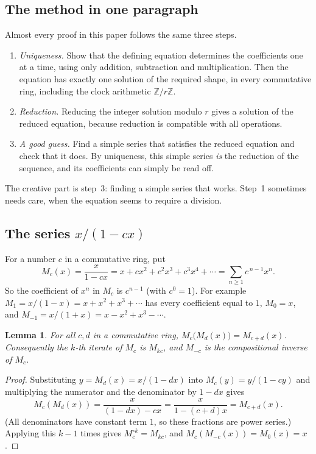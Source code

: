 \documentclass[11pt,a4paper]{article}
\newtheorem{lemma}[theorem]{Lemma}
\theoremstyle{definition}
\theoremstyle{remark}
\newcommand{\Z}{\mathbb{Z}}
\begin{document}
\subsection{The method in one paragraph}
Almost every proof in this paper follows the same three steps.
\begin{enumerate}
\item \emph{Uniqueness.} Show that the defining equation determines the coefficients one at a time, using only
addition, subtraction and multiplication. Then the equation has exactly one solution of the required shape, in every
commutative ring, including the clock arithmetic $\Z/r\Z$.
\item \emph{Reduction.} Reducing the integer solution modulo $r$ gives a solution of the reduced equation,
because reduction is compatible with all operations.
\item \emph{A good guess.} Find a simple series that satisfies the reduced equation and check that it does. By uniqueness,
this simple series \emph{is} the reduction of the sequence, and its coefficients can simply be read off.
\end{enumerate}
The creative part is step~3: finding a simple series that works. Step~1 sometimes needs care, when the equation seems to
require a division.
\subsection{The series \texorpdfstring{$x/(1-cx)$}{x/(1-cx)}}
For a number $c$ in a commutative ring, put
\[
M_c(x)=\frac{x}{1-cx}=x+cx^2+c^2x^3+c^3x^4+\cdots=\sum_{n\ge1}c^{\,n-1}x^n .
\]
So the coefficient of $x^n$ in $M_c$ is $c^{n-1}$ (with $c^0=1$). For example $M_1=x/(1-x)=x+x^2+x^3+\cdots$ has every
coefficient equal to $1$, $M_0=x$, and $M_{-1}=x/(1+x)=x-x^2+x^3-\cdots$.

\begin{lemma}\label{lem:mobius}
For all $c,d$ in a commutative ring, $M_c\bigl(M_d(x)\bigr)=M_{c+d}(x)$. Consequently the $k$-th iterate of $M_c$ is
$M_{kc}$, and $M_{-c}$ is the compositional inverse of $M_c$.
\end{lemma}

\begin{proof}
Substituting $y=M_d(x)=x/(1-dx)$ into $M_c(y)=y/(1-cy)$ and multiplying the numerator and the denominator by $1-dx$
gives
\[
M_c(M_d(x))=\frac{x}{(1-dx)-cx}=\frac{x}{1-(c+d)x}=M_{c+d}(x).
\]
(All denominators have constant term $1$, so these fractions are power series.) Applying this $k-1$ times gives
$M_c^{\circ k}=M_{kc}$, and $M_c(M_{-c}(x))=M_0(x)=x$.
\end{proof}
\end{document}
